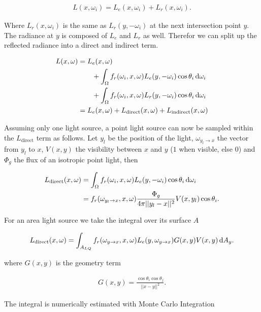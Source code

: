 \begin{align}
L(x, \omega_i) = L_e(x, \omega_i) + L_r(x, \omega_i).
\end{align}

Where $L_r(x, \omega_i)$ is the same as $L_r(y, -\omega_i)$ at the next intersection point $y$. The radiance at $y$ is composed of $L_e$ and $L_r$ as well. Therefor we can split up the reflected radiance into a direct and indirect term.

\begin{align}
L(x, \omega) &= L_e(x, \omega) \\
& \qquad + \int_{\Omega}f_r(\omega_i, x, \omega) L_e(y, -\omega_i)\cos\theta_i \mathop{}\!\mathrm{d}\omega_i \\
& \qquad + \int_{\Omega}f_r(\omega_i, x, \omega) L_r(y, -\omega_i)\cos\theta_i \mathop{}\!\mathrm{d}\omega_i \\
&= L_e(x,\omega) + L_{\text{direct}}(x, \omega) + L_{\text{indirect}}(x,\omega) \label{eq:reqsplit}
\end{align}

Assuming only one light source, a point light source can now be sampled within the $L_{\text{direct}}$ term as follows. Let $y_l$ be the position of the light, $\omega_{y_l\rightarrow x}$ the vector from $y_l$ to $x$, $V(x,y)$ the visibility between $x$ and $y$ ($1$ when visible, else $0$) and $\Phi_g$ the flux of an isotropic point light, then 

\begin{align}
L_{\text{direct}}(x, \omega) &= \int_{\Omega}f_r(\omega_i, x, \omega) L_e(y, -\omega_i)\cos\theta_i \mathop{}\!\mathrm{d}\omega_i \\
&= f_r(\omega_{y_l\rightarrow x}, x, \omega) \frac{\Phi_g}{4\pi||y_l-x||^2} V(x, y_l) \cos\theta_i.
\end{align}

For an area light source we take the integral over its surface $A$

\begin{align}
L_{\text{direct}}(x, \omega) = \int_{A_{LQ}}f_r(\omega_{y \rightarrow x}, x, \omega) L_e(y, \omega_{y \rightarrow x}) G(x,y)V(x,y) \mathop{}\!\mathrm{d} A_y.
\end{align}

where $G(x, y)$ is the geometry term

\begin{align}
G(x,y) = \frac{\cos\theta_i\cos\theta_j}{||x-y||^2}.
\end{align}

The integral is numerically estimated with Monte Carlo Integration

